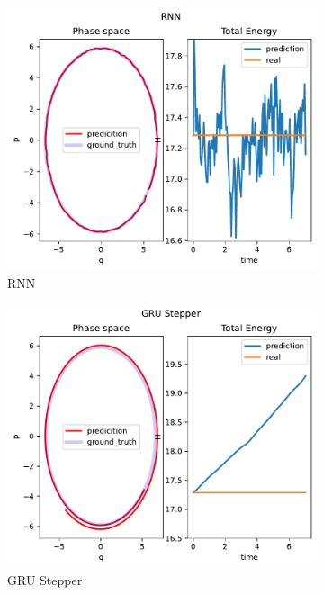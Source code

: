 \begin{figure}[H]
	\begin{subfigure}[b]{0.3\textwidth}
		\centering
		\includegraphics[width=\textwidth]{chapters/chapter5/osci_rnn_ps.pdf}
		\caption{RNN}
	\end{subfigure}
	\hfill
	\begin{subfigure}[b]{0.3\textwidth}
		\centering
		\includegraphics[width=\textwidth]{chapters/chapter5/osci_gre_ps.pdf}
		\caption{GRU Stepper}
	\end{subfigure}
	\hfill
	\begin{subfigure}[b]{0.3\textwidth}

\end{subfigure}
\end{figure}

